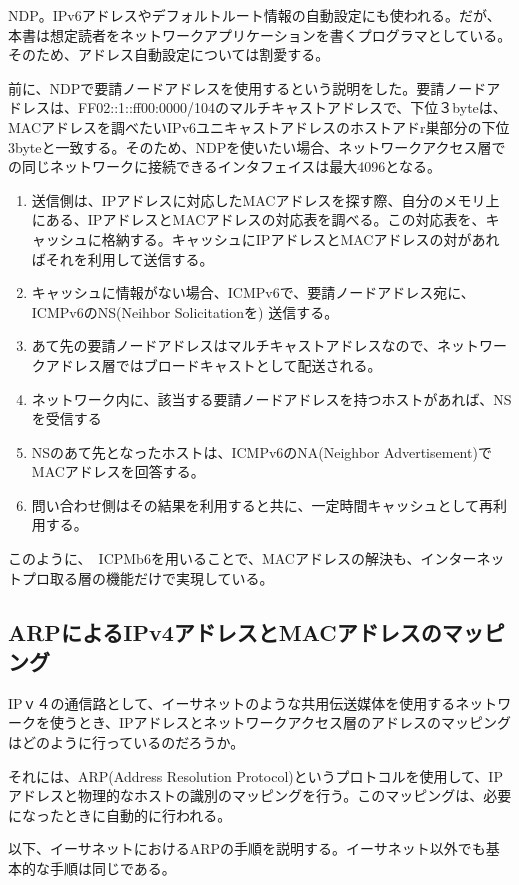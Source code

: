 NDP。IPv6アドレスやデフォルトルート情報の自動設定にも使われる。だが、本書は想定読者をネットワークアプリケーションを書くプログラマとしている。そのため、アドレス自動設定については割愛する。

前に、NDPで要請ノードアドレスを使用するという説明をした。要請ノードアドレスは、FF02::1::ff00:0000/104のマルチキャストアドレスで、下位３byteは、MACアドレスを調べたいIPv6ユニキャストアドレスのホストアドr巣部分の下位3byteと一致する。そのため、NDPを使いたい場合、ネットワークアクセス層での同じネットワークに接続できるインタフェイスは最大4096となる。


\begin{enumerate}
\item 送信側は、IPアドレスに対応したMACアドレスを探す際、自分のメモリ上にある、IPアドレスとMACアドレスの対応表を調べる。この対応表を、キャッシュに格納する。キャッシュにIPアドレスとMACアドレスの対があればそれを利用して送信する。
\item キャッシュに情報がない場合、ICMPv6で、要請ノードアドレス宛に、ICMPv6のNS(Neihbor Solicitationを)
送信する。
\item あて先の要請ノードアドレスはマルチキャストアドレスなので、ネットワークアドレス層ではブロードキャストとして配送される。
\item ネットワーク内に、該当する要請ノードアドレスを持つホストがあれば、NSを受信する
\item NSのあて先となったホストは、ICMPv6のNA(Neighbor Advertisement)でMACアドレスを回答する。
\item 問い合わせ側はその結果を利用すると共に、一定時間キャッシュとして再利用する。
\end{enumerate}

このように、　ICPMb6を用いることで、MACアドレスの解決も、インターネットプロ取る層の機能だけで実現している。

\subsection{ARPによるIPv4アドレスとMACアドレスのマッピング}

IPｖ４の通信路として、イーサネットのような共用伝送媒体を使用するネットワークを使うとき、IPアドレスとネットワークアクセス層のアドレスのマッピングはどのように行っているのだろうか。

それには、ARP(Address Resolution Protocol)というプロトコルを使用して、IPアドレスと物理的なホストの識別のマッピングを行う。このマッピングは、必要になったときに自動的に行われる。

以下、イーサネットにおけるARPの手順を説明する。イーサネット以外でも基本的な手順は同じである。

